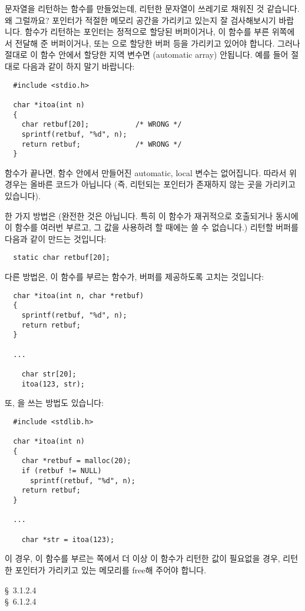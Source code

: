 \begin{faq}
	문자열을 리턴하는 함수를 만들었는데, 리턴한 문자열이
	쓰레기로 채워진 것 같습니다.  왜 그럴까요?
\A
	포인터가 적절한 메모리 공간을 가리키고 있는지 잘 검사해보시기
	바랍니다. 함수가 리턴하는 포인터는 정적으로 할당된 버퍼이거나, 
	이 함수를 부른 위쪽에서 전달해 준 버퍼이거나, 또는 으로
	할당한 버퍼 등을 가리키고 있어야 합니다. 그러나 절대로 이 함수
	안에서 할당한 지역 변수면 (automatic array) 안됩니다.
	예를 들어 절대로 다음과 같이 하지 말기 바랍니다:

\begin{verbatim}
  #include <stdio.h>

  char *itoa(int n)
  {
    char retbuf[20];           /* WRONG */
    sprintf(retbuf, "%d", n);
    return retbuf;             /* WRONG */
  }
\end{verbatim}
	함수가 끝나면, 함수 안에서 만들어진 automatic, local 변수는 없어집니다.
	따라서 위 경우는 올바른 코드가 아닙니다 (즉, 리턴되는 포인터가 존재하지
	않는 곳을 가리키고 있습니다).
	
	한 가지 방법은 (완전한 것은 아닙니다.  특히 이 함수가 재귀적으로
	호출되거나 동시에 이 함수를 여러번 부르고, 그 값을 사용하려 할 때에는
	쓸 수 없습니다.) 리턴할 버퍼를 다음과 같이 만드는 것입니다:
\begin{verbatim}
  static char retbuf[20];
\end{verbatim}

	다른 방법은, 이 함수를 부르는 함수가, 버퍼를 제공하도록 고치는
	것입니다:
\begin{verbatim}
  char *itoa(int n, char *retbuf)
  {
    sprintf(retbuf, "%d", n);
    return retbuf;
  }

  ...

    char str[20];
    itoa(123, str);
\end{verbatim}

	또, 을 쓰는 방법도 있습니다:

\begin{verbatim}
  #include <stdlib.h>

  char *itoa(int n)
  {
    char *retbuf = malloc(20);
    if (retbuf != NULL)
      sprintf(retbuf, "%d", n);
    return retbuf;
  }

  ...

    char *str = itoa(123);
\end{verbatim}

	\noindent 이 경우, 이 함수를 부르는 쪽에서 더 이상 이 함수가 리턴한
	값이 필요없을 경우, 리턴한 포인터가 가리키고 있는 메모리를 free해
	주어야 합니다.

\R
	\cite{ansi} \S\ 3.1.2.4 \\
	\cite{c89} \S\ 6.1.2.4
\end{faq}

